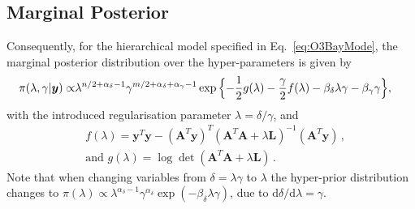 \subsection{Marginal Posterior}
\label{subsec:FirstMargPost}
Consequently, for the hierarchical model specified in Eq.~\ref{eq:O3BayMode}, the marginal posterior distribution over the hyper-parameters is given by
\begin{align}
	\pi( \lambda,\gamma  | \bm{y}) \propto &  \lambda^{n/2 + \alpha_{\delta}-1} \gamma^{m/2 + \alpha_{\delta} + \alpha_{\gamma}-1}   \exp{ \Bigl\{ - \frac{1}{2} g ( \lambda) - \frac{\gamma}{2} f ( \lambda) - \beta_{\delta} \lambda  \gamma - \beta_{\gamma} \gamma \Bigr\}},
	\label{eq:MargPostAppl}
\end{align}
with the introduced regularisation parameter $\lambda = \delta / \gamma$, and
\begin{subequations}
	\begin{align}
		&f ( \lambda) = \bm{y}^T \bm{y} - (\bm{A}^T \bm{y})^T (\bm{A}^T  \bm{A} + \lambda \bm{L})^{-1} (\bm{A}^T \bm{y})  \label{eq:fAppl} \, ,  \\
		&\text{and } g(\lambda) = \log \det (\bm{A}^T  \bm{A} + \lambda \bm{L}) \label{eq:gAppl} \, .
	\end{align}
\end{subequations}
Note that when changing variables from $\delta = \lambda \gamma$ to $\lambda$ the hyper-prior distribution changes to $\pi(\lambda) \propto \lambda^{\alpha_{\delta}-1} \gamma^{\alpha_{\delta}} \exp{(- \beta_{\delta} \lambda  \gamma)} $, due to $\text{d}\delta / \text{d} \lambda = \gamma$.
